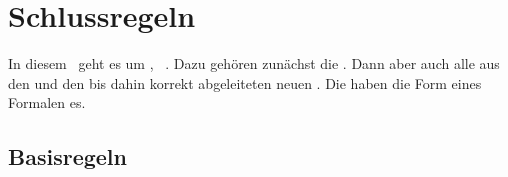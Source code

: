 \section{Schlussregeln}%
\label{sec:Schlussregeln}

In diesem \sectionname\ geht es um , \textdh\ .
Dazu gehören zunächst die .
Dann aber auch alle aus den  und den bis dahin  korrekt abgeleiteten neuen .
Die  haben die Form eines Formalen es.

\subsection{Basisregeln}%
\label{sub:Basisregeln}

